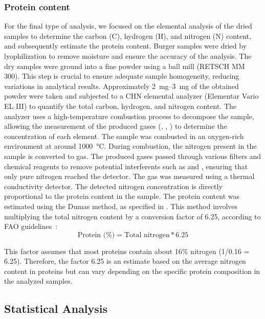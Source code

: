 \subsubsection{Protein content}
For the final type of analysis, we focused on the elemental analysis of the dried samples to determine the carbon (C), hydrogen (H), and nitrogen (N) content, and subsequently estimate the protein content.
Burger samples were dried by lyophilization to remove moisture and ensure the accuracy of the analysis. The dry samples were ground into a fine powder using a ball mill (RETSCH MM 300). This step is crucial to ensure adequate sample homogeneity, reducing variations in analytical results. Approximately \qtyrange{2}{3}{\milli\gram} of the obtained powder were taken and subjected to a CHN elemental analyzer (Elementar Vario EL III) to quantify the total carbon, hydrogen, and nitrogen content. The analyzer uses a high-temperature combustion process to decompose the sample, allowing the measurement of the produced gases (, , ) to determine the concentration of each element.
The sample was combusted in an oxygen-rich environment at around \qty{1000}{\degreeCelsius}. During combustion, the nitrogen present in the sample is converted to  gas. The produced gases passed through various filters and chemical reagents to remove potential interferents such as  and , ensuring that only pure nitrogen reached the detector. The  gas was measured using a thermal conductivity detector. The detected nitrogen concentration is directly proportional to the protein content in the sample.
The protein content was estimated using the Dumas method, as specified in 
. This method involves multiplying the total nitrogen content by a conversion factor of 6.25, according to FAO guidelines~\parencite{fao_2003}:
\[
    \text{Protein (\%)} = \text{Total nitrogen} * 6.25
\]

This factor assumes that most proteins contain about 16\% nitrogen (1/0.16 = 6.25). Therefore, the factor 6.25 is an estimate based on the average nitrogen content in proteins but can vary depending on the specific protein composition in the analyzed samples.

\subsection{Statistical Analysis}

